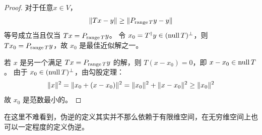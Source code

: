 \begin{proof}
    对于任意\(x \in V\)，
    \[
        \lVert Tx - y\rVert \geq \lVert P_{\operatorname{range} T} y - y\rVert
    \]
    等号成立当且仅当 \(Tx = P_{\operatorname{range} T} y\)。
    令 \(x_0 = T^\dagger y \in (\operatorname{null} T)^\perp\)，则 \(T x_0 =
    P_{\operatorname{range} T} y\)，故 \(x_0\) 是最佳近似解之一。

    若 \(x\) 是另一个满足 \(Tx = P_{\operatorname{range} T} y\) 的解，则 \(T(x - x_0) = 0\)，即
    \(x - x_0 \in \operatorname{null} T\)。
    由于 \(x_0 \in (\operatorname{null} T)^\perp\)，由勾股定理：
    \[
        \lVert x\rVert^2 = \lVert x_0 + (x - x_0)\rVert^2 = \lVert x_0\rVert^2 +
        \lVert x - x_0\rVert^2 \geq \lVert x_0\rVert^2
    \]
    故 \(x_0\) 是范数最小的。
\end{proof}

在这里不难看到，伪逆的定义其实并不那么依赖于有限维空间，在无穷维空间上也可以一定程度的定义伪逆。

